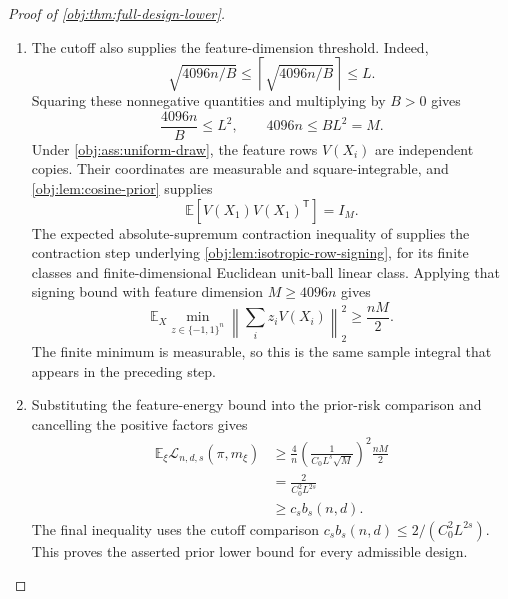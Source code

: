 \begin{proof}[Proof of \cref{obj:thm:full-design-lower}]
\begin{enumerate}
\item
The cutoff also supplies the feature-dimension threshold. Indeed,
\[
\sqrt{4096n/B}
\leq\left\lceil\sqrt{4096n/B}\right\rceil
\leq L.
\]
Squaring these nonnegative quantities and multiplying by \(B>0\) gives
\[
\frac{4096n}{B}\leq L^2,
\qquad
4096n\leq BL^2=M.
\]
Under \cref{obj:ass:uniform-draw}, the feature rows \(V(X_i)\) are independent copies. Their coordinates are measurable and square-integrable, and
\cref{obj:lem:cosine-prior} supplies
\[
\mathbb E\!\left[V(X_1)V(X_1)^{\mathsf T}\right]=I_M.
\]
The expected absolute-supremum contraction inequality of
\citep[Theorem~12(4), with Rademacher complexity as in Definition~2]{BartlettMendelson2002Complexities}
supplies the contraction step underlying \cref{obj:lem:isotropic-row-signing}, for its finite classes and finite-dimensional Euclidean unit-ball linear class. Applying that signing bound with feature dimension \(M\geq4096n\) gives
\[
\mathbb E_X
 \min_{z\in\{-1,1\}^n}
 \left\|\sum_i z_iV(X_i)\right\|_2^2
\geq\frac{nM}{2}.
\]
The finite minimum is measurable, so this is the same sample integral that appears in the preceding step.

\item
Substituting the feature-energy bound into the prior-risk comparison and cancelling the positive factors gives
\[
\begin{aligned}
\mathbb E_\xi\mathcal L_{n,d,s}(\pi,m_\xi)
&\geq
\frac4n\left(\frac{1}{C_0L^s\sqrt M}\right)^2
\frac{nM}{2}\\
&=\frac{2}{C_0^2L^{2s}}\\
&\geq c_sb_s(n,d).
\end{aligned}
\]
The final inequality uses the cutoff comparison \(c_sb_s(n,d)\leq 2/(C_0^2L^{2s})\). This proves the asserted prior lower bound for every admissible design.


\end{enumerate}
\end{proof}
